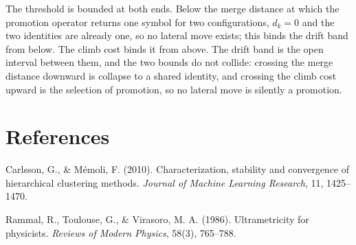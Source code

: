 \documentclass[11pt,oneside]{report}
\theoremstyle{definition}
\theoremstyle{remark}
\newenvironment{reflist}
  {\par\small\setlength{\parindent}{0pt}%
   \setlength{\leftskip}{1.6em}\setlength{\parindent}{-1.6em}%
   \setlength{\parskip}{0.4em}%
   \raggedright\hyphenpenalty=50\exhyphenpenalty=50\relax
   \sloppy}
  {\par}
\begin{document}
The threshold is bounded at both ends. Below the merge distance at which the promotion operator returns one symbol for two configurations, \ensuremath{d_k = 0} and the two identities are already one, so no lateral move exists; this binds the drift band from below. The climb cost binds it from above. The drift band is the open interval between them, and the two bounds do not collide: crossing the merge distance downward is collapse to a shared identity, and crossing the climb cost upward is the selection of promotion, so no lateral move is silently a promotion.

\section*{References}


\begin{reflist}
Carlsson, G., \& M\'emoli, F. (2010). Characterization, stability and convergence of hierarchical clustering methods. \emph{Journal of Machine Learning Research}, 11, 1425--1470.

Rammal, R., Toulouse, G., \& Virasoro, M. A. (1986). Ultrametricity for physicists. \emph{Reviews of Modern Physics}, 58(3), 765--788.
\end{reflist}
\end{document}

